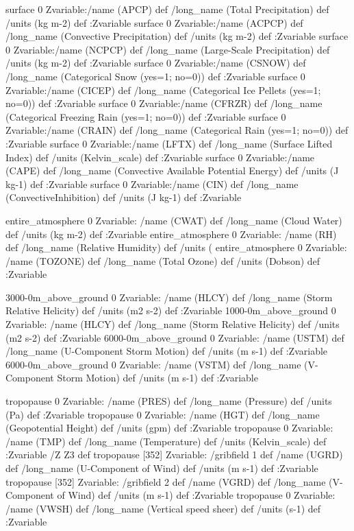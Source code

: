 \begin{ingrid}

surface  0 Zvariable:/name (APCP) def /long_name (Total Precipitation) def /units (kg m-2) def :Zvariable
surface  0 Zvariable:/name (ACPCP) def /long_name (Convective Precipitation) def /units (kg m-2) def :Zvariable
surface  0 Zvariable:/name (NCPCP) def /long_name (Large-Scale Precipitation) def /units (kg m-2) def :Zvariable
surface  0 Zvariable:/name (CSNOW) def /long_name (Categorical Snow (yes=1; no=0)) def :Zvariable
surface  0 Zvariable:/name (CICEP) def /long_name (Categorical Ice Pellets (yes=1; no=0)) def :Zvariable
surface  0 Zvariable:/name (CFRZR) def /long_name (Categorical Freezing Rain (yes=1; no=0)) def :Zvariable
surface  0 Zvariable:/name (CRAIN) def /long_name (Categorical Rain (yes=1; no=0)) def :Zvariable
surface  0 Zvariable:/name (LFTX) def /long_name (Surface Lifted Index) def /units (Kelvin_scale) def :Zvariable
surface  0 Zvariable:/name (CAPE) def /long_name (Convective Available Potential Energy) def /units (J kg-1) def :Zvariable
surface  0 Zvariable:/name (CIN) def /long_name (ConvectiveInhibition) def /units (J kg-1) def :Zvariable

\end{ingrid}
\begin{ingrid}

entire_atmosphere  0 Zvariable: /name (CWAT) def /long_name (Cloud Water) def /units (kg m-2) def :Zvariable
entire_atmosphere  0 Zvariable: /name (RH) def /long_name (Relative Humidity) def /units (%
entire_atmosphere  0 Zvariable: /name (TOZONE) def /long_name (Total Ozone) def /units (Dobson) def :Zvariable

\end{ingrid}
\begin{ingrid}

3000-0m_above_ground 0 Zvariable: /name (HLCY) def /long_name (Storm Relative Helicity) def /units (m2 s-2) def :Zvariable
1000-0m_above_ground 0 Zvariable: /name (HLCY) def /long_name (Storm Relative Helicity) def /units (m2 s-2) def :Zvariable
6000-0m_above_ground 0 Zvariable: /name (USTM) def /long_name (U-Component Storm Motion) def /units (m s-1) def :Zvariable
6000-0m_above_ground 0 Zvariable: /name (VSTM) def /long_name (V-Component Storm Motion) def /units (m s-1) def :Zvariable

\end{ingrid}
\begin{ingrid}

tropopause 0 Zvariable: /name (PRES) def /long_name (Pressure) def /units (Pa) def :Zvariable
tropopause 0 Zvariable: /name (HGT) def /long_name (Geopotential Height) def /units (gpm) def :Zvariable
tropopause 0 Zvariable: /name (TMP) def /long_name (Temperature) def /units (Kelvin_scale) def :Zvariable
/Z Z3 def
tropopause [352] Zvariable: /gribfield 1 def /name (UGRD) def /long_name (U-Component of Wind) def /units (m s-1) def :Zvariable
tropopause [352] Zvariable: /gribfield 2 def /name (VGRD) def /long_name (V-Component of Wind) def /units (m s-1) def :Zvariable
tropopause 0 Zvariable: /name (VWSH) def /long_name (Vertical speed sheer) def /units (s-1) def :Zvariable

\end{ingrid}
